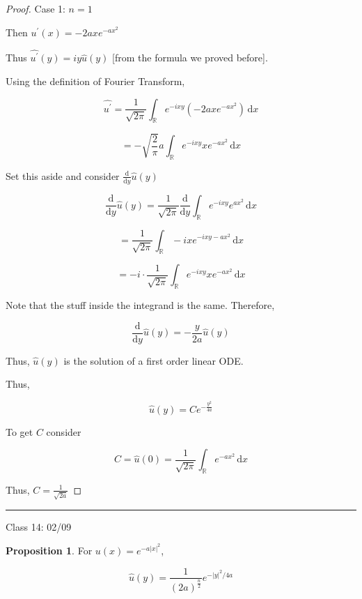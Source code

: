 \documentclass{article}
\theoremstyle{definition}
\newtheorem{proposition}{Proposition}
\begin{document}
\begin{proof}
    Case 1: \(n = 1\) 

    Then \(u^{\prime} (x)=-2a x e^{-ax^2}\) 

    Thus \(\widehat{u^{\prime} }(y)=iy\widehat{u}(y)\) [from the formula we proved before].

    Using the definition of Fourier Transform,

    \[
        \widehat{u^{\prime} } = \frac{1}{\sqrt{2\pi} }\int_{\mathbb{R}}^{} e^{-ixy}(-2axe^{-ax^2}) \,\mathrm{d}x 
    \]

    \[
        =-\sqrt{\frac{2}{\pi }} a \int_{\mathbb{R}}^{} e^{-ixy}xe^{-ax^2} \,\mathrm{d}x 
    \]

    Set this aside and consider \(\frac{\mathrm{d}}{\mathrm{d}y} \hat{u}(y)\)
    
    \[
        \frac{\mathrm{d}}{\mathrm{d}y} \hat{u}(y) = \frac{1}{\sqrt{2\pi } } \frac{\mathrm{d}}{\mathrm{d}y} \int_{\mathbb{R} }^{} e^{-ixy}e^{ax^2} \,\mathrm{d}x 
    \]

    \[
        =\frac{1}{\sqrt{2\pi } }\int_{\mathbb{R}}^{} -i x e^{-ixy - ax^2} \,\mathrm{d}x 
    \]

    \[
        = - i \cdot \frac{1}{\sqrt{2\pi }} \int_{\mathbb{R} }^{} e^{-ixy}xe^{-ax^2} \,\mathrm{d}x 
    \]

    Note that the stuff inside the integrand is the same. Therefore,

    \[
        \frac{\mathrm{d}}{\mathrm{d}y} \widehat{u}(y) = - \frac{y}{2a}\widehat{u}(y)
    \]

    Thus, \(\widehat{u}(y)\) is the solution of a first order linear ODE.

    Thus,

    \[
        \widehat{u}(y) = C e^{- \frac{y^2}{4a}}
    \]

    To get \(C\) consider

    \[
        C = \widehat{u}(0) = \frac{1}{\sqrt{2\pi}}\int_{\mathbb{R}}^{} e^{-ax^2} \,\mathrm{d}x 
    \]

    Thus, \(C = \frac{1}{\sqrt{2a}}\) 

\end{proof}

\hfil
\hrule

Class 14: 02/09

\begin{proposition}
    For \(u(x) =e^{-a \vert x \vert ^2}\),

    \[
        \widehat{u}(y) = \frac{1}{(2a)^{\frac{n}{2}}}e^{- \vert y \vert ^2 / 4a}
    \]

\end{proposition}
\end{document}
